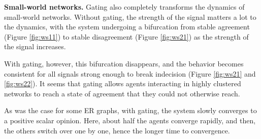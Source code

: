 \documentclass[]{article}
\begin{document}
\textbf{Small-world networks.} Gating also completely transforms the dynamics of small-world networks. Without gating, the strength of the signal matters a lot to the dynamics, with the system undergoing a bifurcation from stable agreement (Figure \ref{fig:ws11}) to stable disagreement (Figure \ref{fig:ws21}) as the strength of the signal increases.

With gating, however, this bifurcation disappears, and the behavior becomes consistent for all signals strong enough to break indecision (Figure \ref{fig:ws21} and \ref{fig:ws22}). It seems that gating allows agents interacting in highly clustered networks to reach a state of agreement that they could not otherwise reach.

As was the case for some ER graphs, with gating, the system slowly converges to a positive scalar opinion. Here, about half the agents converge rapidly, and then, the others switch over one by one, hence the longer time to convergence.
\end{document}
